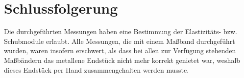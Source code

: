 \documentclass[
	a4paper,
	12pt,
	pagesize,
	ngerman
]{scrartcl}
\begin{document}
	\section{Schlussfolgerung}
	Die durchgeführten Messungen haben eine Bestimmung der Elastizitäts- bzw. Schubmodule erlaubt.
	Alle Messungen, die mit einem Maßband durchgeführt wurden, waren insofern erschwert, als dass bei allen zur Verfügung stehenden Maßbändern das metallene Endstück nicht mehr korrekt genietet war, weshalb dieses Endstück per Hand zusammengehalten werden musste.
	\printbibliography
\end{document}
